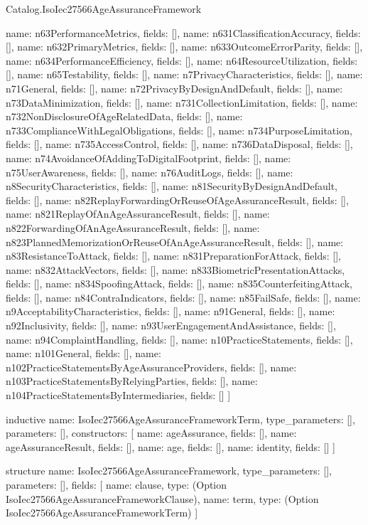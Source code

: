 \begin{lexlean}{Catalog.IsoIec27566AgeAssuranceFramework}
\begin{semanticmodule}
{    {name: n63PerformanceMetrics, fields: []},
    {name: n631ClassificationAccuracy, fields: []},
    {name: n632PrimaryMetrics, fields: []},
    {name: n633OutcomeErrorParity, fields: []},
    {name: n634PerformanceEfficiency, fields: []},
    {name: n64ResourceUtilization, fields: []},
    {name: n65Testability, fields: []},
    {name: n7PrivacyCharacteristics, fields: []},
    {name: n71General, fields: []},
    {name: n72PrivacyByDesignAndDefault, fields: []},
    {name: n73DataMinimization, fields: []},
    {name: n731CollectionLimitation, fields: []},
    {name: n732NonDisclosureOfAgeRelatedData, fields: []},
    {name: n733ComplianceWithLegalObligations, fields: []},
    {name: n734PurposeLimitation, fields: []},
    {name: n735AccessControl, fields: []},
    {name: n736DataDisposal, fields: []},
    {name: n74AvoidanceOfAddingToDigitalFootprint, fields: []},
    {name: n75UserAwareness, fields: []},
    {name: n76AuditLogs, fields: []},
    {name: n8SecurityCharacteristics, fields: []},
    {name: n81SecurityByDesignAndDefault, fields: []},
    {name: n82ReplayForwardingOrReuseOfAgeAssuranceResult, fields: []},
    {name: n821ReplayOfAnAgeAssuranceResult, fields: []},
    {name: n822ForwardingOfAnAgeAssuranceResult, fields: []},
    {name: n823PlannedMemorizationOrReuseOfAnAgeAssuranceResult, fields: []},
    {name: n83ResistanceToAttack, fields: []},
    {name: n831PreparationForAttack, fields: []},
    {name: n832AttackVectors, fields: []},
    {name: n833BiometricPresentationAttacks, fields: []},
    {name: n834SpoofingAttack, fields: []},
    {name: n835CounterfeitingAttack, fields: []},
    {name: n84ContraIndicators, fields: []},
    {name: n85FailSafe, fields: []},
    {name: n9AcceptabilityCharacteristics, fields: []},
    {name: n91General, fields: []},
    {name: n92Inclusivity, fields: []},
    {name: n93UserEngagementAndAssistance, fields: []},
    {name: n94ComplaintHandling, fields: []},
    {name: n10PracticeStatements, fields: []},
    {name: n101General, fields: []},
    {name: n102PracticeStatementsByAgeAssuranceProviders, fields: []},
    {name: n103PracticeStatementsByRelyingParties, fields: []},
    {name: n104PracticeStatementsByIntermediaries, fields: []}
  ]
}

inductive{
  name: IsoIec27566AgeAssuranceFrameworkTerm,
  type_parameters: [],
  parameters: [],
  constructors: [
    {name: ageAssurance, fields: []},
    {name: ageAssuranceResult, fields: []},
    {name: age, fields: []},
    {name: identity, fields: []}
  ]
}

structure{
  name: IsoIec27566AgeAssuranceFramework,
  type_parameters: [],
  parameters: [],
  fields: [
    {name: clause, type: (Option IsoIec27566AgeAssuranceFrameworkClause)},
    {name: term, type: (Option IsoIec27566AgeAssuranceFrameworkTerm)}
  ]
}
\end{semanticmodule}
\end{lexlean}
